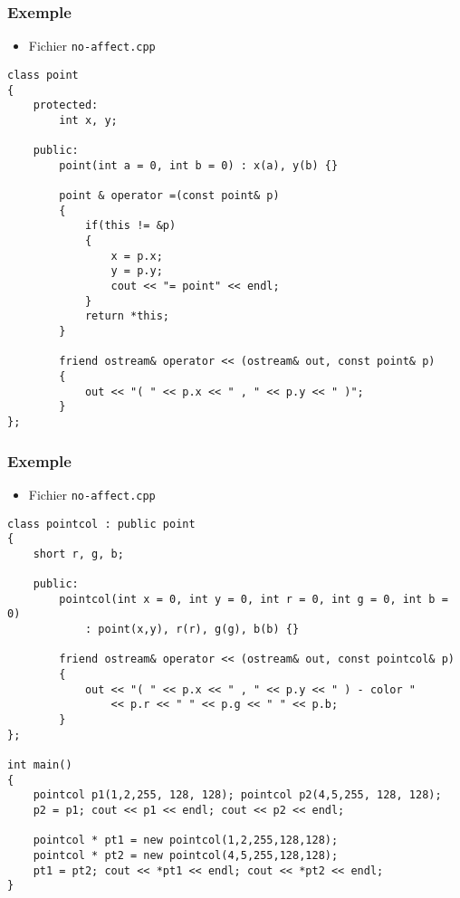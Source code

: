 \begin{frame}[containsverbatim]
\frametitle{Exemple}
\begin{itemize}
\item Fichier \texttt{no-affect.cpp}
\end{itemize}
\begin{lstlisting}
class point
{
	protected:
		int x, y;
	
	public:
		point(int a = 0, int b = 0) : x(a), y(b) {}

		point & operator =(const point& p)
		{
			if(this != &p)
			{
				x = p.x;
				y = p.y;
				cout << "= point" << endl;
			}
			return *this;
		}

		friend ostream& operator << (ostream& out, const point& p)
		{
			out << "( " << p.x << " , " << p.y << " )";
		}
};
\end{lstlisting}
\end{frame}

\begin{frame}[containsverbatim]
\frametitle{Exemple}
\begin{itemize}
\item Fichier \texttt{no-affect.cpp}
\end{itemize}
\begin{lstlisting}
class pointcol : public point
{
	short r, g, b;
	
	public:
		pointcol(int x = 0, int y = 0, int r = 0, int g = 0, int b = 0) 
			: point(x,y), r(r), g(g), b(b) {}

		friend ostream& operator << (ostream& out, const pointcol& p)
		{
			out << "( " << p.x << " , " << p.y << " ) - color " 
			    << p.r << " " << p.g << " " << p.b;
		}
};

int main()
{
	pointcol p1(1,2,255, 128, 128); pointcol p2(4,5,255, 128, 128);
	p2 = p1; cout << p1 << endl; cout << p2 << endl;	

	pointcol * pt1 = new pointcol(1,2,255,128,128);
	pointcol * pt2 = new pointcol(4,5,255,128,128);
	pt1 = pt2; cout << *pt1 << endl; cout << *pt2 << endl;
}
\end{lstlisting}
\end{frame}

